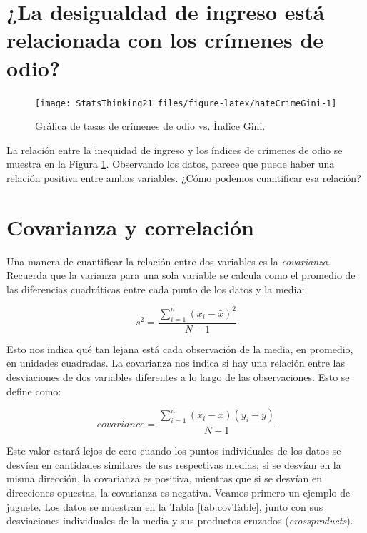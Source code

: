 \documentclass[
  12pt,
]{book}
\begin{document}
\hypertarget{la-desigualdad-de-ingreso-estuxe1-relacionada-con-los-cruxedmenes-de-odio}{%
\section{¿La desigualdad de ingreso está relacionada con los crímenes de odio?}\label{la-desigualdad-de-ingreso-estuxe1-relacionada-con-los-cruxedmenes-de-odio}}

\begin{figure}
\texttt{[image: StatsThinking21\_files/figure-latex/hateCrimeGini-1]} \caption{Gráfica de tasas de crímenes de odio vs. Índice Gini.}\label{fig:hateCrimeGini}
\end{figure}

La relación entre la inequidad de ingreso y los índices de crímenes de odio se muestra en la Figura \ref{fig:hateCrimeGini}.
Observando los datos, parece que puede haber una relación positiva entre ambas variables. ¿Cómo podemos cuantificar esa relación?

\hypertarget{covariance-and-correlation}{%
\section{Covarianza y correlación}\label{covariance-and-correlation}}

Una manera de cuantificar la relación entre dos variables es la \emph{covarianza}. Recuerda que la varianza para una sola variable se calcula como el promedio de las diferencias cuadráticas entre cada punto de los datos y la media:

\[
s^2 = \frac{\sum_{i=1}^n (x_i - \bar{x})^2}{N - 1}
\]

Esto nos indica qué tan lejana está cada observación de la media, en promedio, en unidades cuadradas. La covarianza nos indica si hay una relación entre las desviaciones de dos variables diferentes a lo largo de las observaciones. Esto se define como:

\[
covariance = \frac{\sum_{i=1}^n (x_i - \bar{x})(y_i - \bar{y})}{N - 1}
\]

Este valor estará lejos de cero cuando los puntos individuales de los datos se desvíen en cantidades similares de sus respectivas medias; si se desvían en la misma dirección, la covarianza es positiva, mientras que si se desvían en direcciones opuestas, la covarianza es negativa. Veamos primero un ejemplo de juguete. Los datos se muestran en la Tabla \ref{tab:covTable}, junto con sus desviaciones individuales de la media y sus productos cruzados (\emph{crossproducts}).
\end{document}
